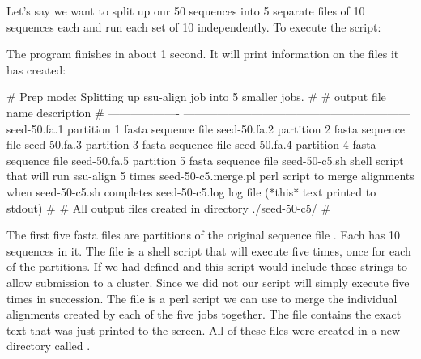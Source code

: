 Let's say we want to split up our 50 sequences into 5 separate files
of 10 sequences each and run each set of 10 independently. 
To execute the script:


The program finishes in about 1 second. It will print information on
the files it has created:

\begin{comment}
# ssu-align :: define and align SSU rRNA sequences
# SSU-ALIGN 0.1 (June 2009)
# Copyright (C) 2009 HHMI Janelia Farm Research Campus
# Freely distributed under the GNU General Public License (GPLv3)
# - - - - - - - - - - - - - - - - - - - - - - - - - - - - - - - - - - - -
# command: /groups/eddy/home/nawrockie/ssualign/ssu-align -F -c 5 ../../seeds/ssu5-0p1.cm seed-50.fa seed-50-c5 ../../sa-0p1.params
# date:    Thu Jun 18 16:27:21 2009
#
\end{comment}
\begin{sreoutput}
# Prep mode: Splitting up ssu-align job into 5 smaller jobs.
#
# output file name     description                                                 
# -------------------  ------------------------------------------------------------
  seed-50.fa.1         partition 1 fasta sequence file
  seed-50.fa.2         partition 2 fasta sequence file
  seed-50.fa.3         partition 3 fasta sequence file
  seed-50.fa.4         partition 4 fasta sequence file
  seed-50.fa.5         partition 5 fasta sequence file
  seed-50-c5.sh        shell script that will run ssu-align 5 times
  seed-50-c5.merge.pl  perl script to merge alignments when seed-50-c5.sh completes
  seed-50-c5.log       log file (*this* text printed to stdout)
#
# All output files created in directory ./seed-50-c5/
#
\end{sreoutput}

The first five fasta files are partitions of the original sequence
file . Each has 10 sequences in it. The file
 is a shell script that will execute
 five times, once for each of the partitions. 
If we had defined  and
 this script would include those strings to
allow submission to a cluster. Since we did not our script will simply
execute  five times in succession. The file
 is a perl script we can use to merge the
individual alignments created by each of the five jobs together.
The  file contains the exact text that was just
printed to the screen. All of these files were created in a new
directory called .

